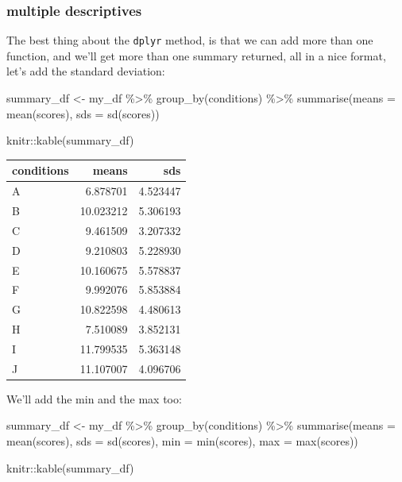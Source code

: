 \documentclass[
]{book}
\newenvironment{Shaded}{\begin{snugshade}}{\end{snugshade}}
\newcommand{\AttributeTok}[1]{\textcolor[rgb]{0.77,0.63,0.00}{#1}}
\newcommand{\FunctionTok}[1]{\textcolor[rgb]{0.00,0.00,0.00}{#1}}
\newcommand{\NormalTok}[1]{#1}
\newcommand{\OtherTok}[1]{\textcolor[rgb]{0.56,0.35,0.01}{#1}}
\newcommand{\SpecialCharTok}[1]{\textcolor[rgb]{0.00,0.00,0.00}{#1}}
\begin{document}
\hypertarget{multiple-descriptives}{%
\subsubsection{multiple descriptives}\label{multiple-descriptives}}

The best thing about the \texttt{dplyr} method, is that we can add more than one function, and we'll get more than one summary returned, all in a nice format, let's add the standard deviation:

\begin{Shaded}
\begin{Highlighting}[]
\NormalTok{summary\_df }\OtherTok{\textless{}{-}}\NormalTok{ my\_df }\SpecialCharTok{\%\textgreater{}\%}
               \FunctionTok{group\_by}\NormalTok{(conditions) }\SpecialCharTok{\%\textgreater{}\%}
               \FunctionTok{summarise}\NormalTok{(}\AttributeTok{means =} \FunctionTok{mean}\NormalTok{(scores),}
                         \AttributeTok{sds =} \FunctionTok{sd}\NormalTok{(scores))}

\NormalTok{knitr}\SpecialCharTok{::}\FunctionTok{kable}\NormalTok{(summary\_df)}
\end{Highlighting}
\end{Shaded}

\begin{tabular}{l|r|r}
\hline
conditions & means & sds\\
\hline
A & 6.878701 & 4.523447\\
\hline
B & 10.023212 & 5.306193\\
\hline
C & 9.461509 & 3.207332\\
\hline
D & 9.210803 & 5.228930\\
\hline
E & 10.160675 & 5.578837\\
\hline
F & 9.992076 & 5.853884\\
\hline
G & 10.822598 & 4.480613\\
\hline
H & 7.510089 & 3.852131\\
\hline
I & 11.799535 & 5.363148\\
\hline
J & 11.107007 & 4.096706\\
\hline
\end{tabular}

We'll add the min and the max too:

\begin{Shaded}
\begin{Highlighting}[]
\NormalTok{summary\_df }\OtherTok{\textless{}{-}}\NormalTok{ my\_df }\SpecialCharTok{\%\textgreater{}\%}
               \FunctionTok{group\_by}\NormalTok{(conditions) }\SpecialCharTok{\%\textgreater{}\%}
               \FunctionTok{summarise}\NormalTok{(}\AttributeTok{means =} \FunctionTok{mean}\NormalTok{(scores),}
                         \AttributeTok{sds =} \FunctionTok{sd}\NormalTok{(scores),}
                         \AttributeTok{min =} \FunctionTok{min}\NormalTok{(scores),}
                         \AttributeTok{max =} \FunctionTok{max}\NormalTok{(scores))}

\NormalTok{knitr}\SpecialCharTok{::}\FunctionTok{kable}\NormalTok{(summary\_df)}
\end{Highlighting}
\end{Shaded}
\end{document}
